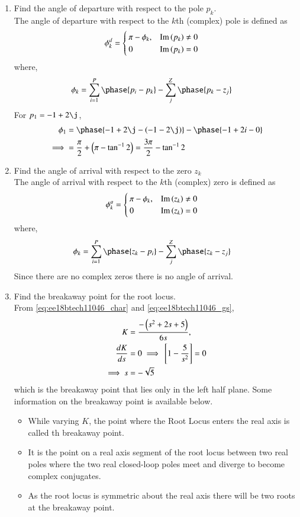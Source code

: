 \begin{enumerate}[label=\thesubsection.\arabic*.,ref=\thesubsection.\theenumi]
\item Find the angle of departure with respect to the  pole $p_k$.
\\
\solution The angle of departure with respect to the $k$th (complex) pole is defined as 
\begin{align}
\phi_{k}^{d}&=
\begin{cases}
\pi-\phi_k, &  \text{Im}\left(p_k\right) \ne 0
\\
0 & \text{Im}\left(p_k\right) = 0
\end{cases}
\end{align}
where,
\begin{align}
\phi_k&=\sum_{i=1}^{P} \phase{p_i-p_k}-\sum_{j}^{Z} \phase{p_k - z_{j}}
\end{align}
%
For $p_1 = -1+2\j$, 
\begin{align}
\phi_{1} &= \phase{-1+2\j-\brak{-1-2\j}} - \phase{-1+2i-0}
\\
\implies  &= \frac{\pi}{2} + \brak{\pi - \tan^{-1}2} = \frac{3\pi}{2} - \tan^{-1}2
\end{align}
%
\item Find the angle of arrival with respect to the zero $z_k$
\\
\solution The angle of arrival with respect to the $k$th (complex) zero is defined as 
\begin{align}
\phi_{k}^{a}&=
\begin{cases}
\pi-\phi_k, &  \text{Im}\left(z_k\right) \ne 0
\\
0 & \text{Im}\left(z_k\right) = 0
\end{cases}
\end{align}
where,
\begin{align}
\phi_k&=\sum_{i=1}^{P} \phase{z_k-p_i}-\sum_{j}^{Z} \phase{z_k - z_{j}}
\end{align}
%
Since there are no complex zeros there is no angle of arrival.

\item Find the breakaway point for the root locus.
\\
\solution From \eqref{eq:ee18btech11046_char} and 
\eqref{eq:ee18btech11046_gs},
    \begin{align}
        K&=\frac{-\left(s^{2}+2 s+5\right)}{6 s},
\\
        \frac{d K}{d s}&=0 \implies {}\left[1-\frac{5}{s^{2}}\right]=0 
\\
  \implies        s&=-\sqrt{5}
    \end{align}
%
which is the  breakaway point that lies only in the left half plane. Some information on the breakaway point is available below.
\begin{itemize}
\item While varying $K$, the point where the Root Locus enters the real axis is called th breakaway point.
\item   It is the point on a real axis segment of the root locus between two real poles where the two real closed-loop poles meet and diverge to become complex conjugates.
\item  As the root locus is symmetric about the real axis there will be two roots at the breakaway point. 


\end{itemize}
\end{enumerate}

